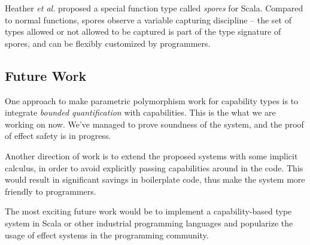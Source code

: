 Heather \emph{et al.} proposed a special function type called
\emph{spores} for Scala\cite{miller2014spores}. Compared to normal
functions, spores observe a variable capturing discipline -- the set
of types allowed or not allowed to be captured is part of the type
signature of spores, and can be flexibly customized by programmers.

\subsection{Future Work}

One approach to make parametric polymorphism work for capability types
is to integrate \emph{bounded quantification} with capabilities. This
is the what we are working on now. We've managed to prove soundness of
the system, and the proof of effect safety is in progress.

Another direction of work is to extend the proposed systems with some
implicit calculus, in order to avoid explicitly passing capabilities
around in the code. This would result in significant savings in
boilerplate code, thus make the system more friendly to programmers.

The most exciting future work would be to implement a capability-based
type system in Scala or other industrial programming languages and
popularize the usage of effect systems in the programming community.
